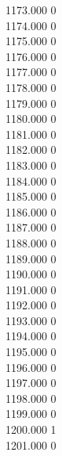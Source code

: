 { 1173.000	0 \\
 1174.000	0 \\
 1175.000	0 \\
 1176.000	0 \\
 1177.000	0 \\
 1178.000	0 \\
 1179.000	0 \\
 1180.000	0 \\
 1181.000	0 \\
 1182.000	0 \\
 1183.000	0 \\
 1184.000	0 \\
 1185.000	0 \\
 1186.000	0 \\
 1187.000	0 \\
 1188.000	0 \\
 1189.000	0 \\
 1190.000	0 \\
 1191.000	0 \\
 1192.000	0 \\
 1193.000	0 \\
 1194.000	0 \\
 1195.000	0 \\
 1196.000	0 \\
 1197.000	0 \\
 1198.000	0 \\
 1199.000	0 \\
 1200.000	1 \\
 1201.000	0 \\
}
